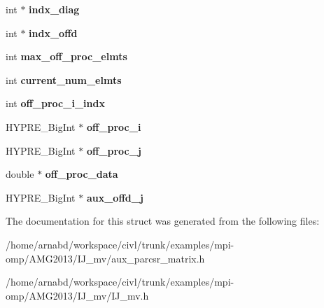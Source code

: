 \begin{DoxyCompactItemize}
\item 
\hypertarget{structhypre__AuxParCSRMatrix_abffced0f8adc04eb65fca9c256638b21}{}int $\ast$ {\bfseries indx\+\_\+diag}\label{structhypre__AuxParCSRMatrix_abffced0f8adc04eb65fca9c256638b21}

\item 
\hypertarget{structhypre__AuxParCSRMatrix_a5fe9854f15194f4201da85f6b2250756}{}int $\ast$ {\bfseries indx\+\_\+offd}\label{structhypre__AuxParCSRMatrix_a5fe9854f15194f4201da85f6b2250756}

\item 
\hypertarget{structhypre__AuxParCSRMatrix_aa2ba52bf1dd3b2487435d14152ffdd3e}{}int {\bfseries max\+\_\+off\+\_\+proc\+\_\+elmts}\label{structhypre__AuxParCSRMatrix_aa2ba52bf1dd3b2487435d14152ffdd3e}

\item 
\hypertarget{structhypre__AuxParCSRMatrix_a9ac8dbb52562ece20ae5ee591f29f542}{}int {\bfseries current\+\_\+num\+\_\+elmts}\label{structhypre__AuxParCSRMatrix_a9ac8dbb52562ece20ae5ee591f29f542}

\item 
\hypertarget{structhypre__AuxParCSRMatrix_ac9c62522246ddc9c51fe43b028b73f85}{}int {\bfseries off\+\_\+proc\+\_\+i\+\_\+indx}\label{structhypre__AuxParCSRMatrix_ac9c62522246ddc9c51fe43b028b73f85}

\item 
\hypertarget{structhypre__AuxParCSRMatrix_a2ed502db3b462d84941e6cb75c06e8be}{}H\+Y\+P\+R\+E\+\_\+\+Big\+Int $\ast$ {\bfseries off\+\_\+proc\+\_\+i}\label{structhypre__AuxParCSRMatrix_a2ed502db3b462d84941e6cb75c06e8be}

\item 
\hypertarget{structhypre__AuxParCSRMatrix_aac746bbbfad6c0bd414179ee9a415c10}{}H\+Y\+P\+R\+E\+\_\+\+Big\+Int $\ast$ {\bfseries off\+\_\+proc\+\_\+j}\label{structhypre__AuxParCSRMatrix_aac746bbbfad6c0bd414179ee9a415c10}

\item 
\hypertarget{structhypre__AuxParCSRMatrix_aa913d8ba765312b0612eae025974a27e}{}double $\ast$ {\bfseries off\+\_\+proc\+\_\+data}\label{structhypre__AuxParCSRMatrix_aa913d8ba765312b0612eae025974a27e}

\item 
\hypertarget{structhypre__AuxParCSRMatrix_a4d1c5942c156598cb6281ca5be36a9d3}{}H\+Y\+P\+R\+E\+\_\+\+Big\+Int $\ast$ {\bfseries aux\+\_\+offd\+\_\+j}\label{structhypre__AuxParCSRMatrix_a4d1c5942c156598cb6281ca5be36a9d3}

\end{DoxyCompactItemize}


The documentation for this struct was generated from the following files\+:\begin{DoxyCompactItemize}
\item 
/home/arnabd/workspace/civl/trunk/examples/mpi-\/omp/\+A\+M\+G2013/\+I\+J\+\_\+mv/aux\+\_\+parcsr\+\_\+matrix.\+h\item 
/home/arnabd/workspace/civl/trunk/examples/mpi-\/omp/\+A\+M\+G2013/\+I\+J\+\_\+mv/I\+J\+\_\+mv.\+h\end{DoxyCompactItemize}
